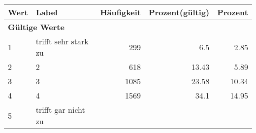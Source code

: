      \begin{longtable}{lXrrr}
     \toprule
     \textbf{Wert} & \textbf{Label} & \textbf{Häufigkeit} & \textbf{Prozent(gültig)} & \textbf{Prozent} \\
     \endhead
     \midrule
     \multicolumn{5}{l}{\textbf{Gültige Werte}}\\

     1 &
     \multicolumn{1}{X}{ trifft sehr stark zu   } &


       \num{299} &
       \num[round-mode=places,round-precision=2]{6.5} &
         \num[round-mode=places,round-precision=2]{2.85} \\

     2 &
     \multicolumn{1}{X}{ 2   } &


       \num{618} &
       \num[round-mode=places,round-precision=2]{13.43} &
         \num[round-mode=places,round-precision=2]{5.89} \\

     3 &
     \multicolumn{1}{X}{ 3   } &


       \num{1085} &
       \num[round-mode=places,round-precision=2]{23.58} &
         \num[round-mode=places,round-precision=2]{10.34} \\

     4 &
     \multicolumn{1}{X}{ 4   } &


       \num{1569} &
       \num[round-mode=places,round-precision=2]{34.1} &
         \num[round-mode=places,round-precision=2]{14.95} \\

     5 &
     \multicolumn{1}{X}{ trifft gar nicht zu   } &



\end{longtable}
